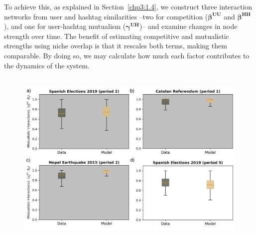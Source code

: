 To achieve this, as explained in Section~\ref{chp3:1.4}, we construct three interaction networks from user and hashtag similarities --two for competition ($\boldsymbol{\beta^{UU}}$ and $\boldsymbol{\beta^{HH}}$), and one for user-hashtag mutualism ($\boldsymbol{\gamma^{UH}}$)-- and examine changes in node strength over time. The benefit of estimating competitive and mutualistic strengths using niche overlap  \cite{cai2021niches} is that it rescales both terms, making them comparable. By doing so, we may calculate how much each factor contributes to the dynamics of the system. \\ \\

\begin{figure}
    \centering
   \includegraphics[width=1.05\textwidth]{figures/chp3/fig9.pdf}
   

\end{figure}
